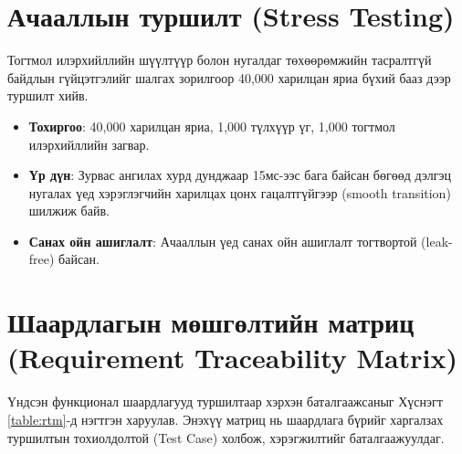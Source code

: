 \section{Ачааллын туршилт (Stress Testing)}
Тогтмол илэрхийллийн шүүлтүүр болон нугалдаг төхөөрөмжийн тасралтгүй байдлын гүйцэтгэлийг шалгах зорилгоор 40,000 харилцан яриа бүхий бааз дээр туршилт хийв.

\begin{itemize}
    \item \textbf{Тохиргоо}: 40,000 харилцан яриа, 1,000 түлхүүр үг, 1,000 тогтмол илэрхийллийн загвар.
    \item \textbf{Үр дүн}: Зурвас ангилах хурд дунджаар 15мс-ээс бага байсан бөгөөд дэлгэц нугалах үед хэрэглэгчийн харилцах цонх гацалтгүйгээр (smooth transition) шилжиж байв.
    \item \textbf{Санах ойн ашиглалт}: Ачааллын үед санах ойн ашиглалт тогтвортой (leak-free) байсан.
\end{itemize}

\section{Шаардлагын мөшгөлтийн матриц (Requirement Traceability Matrix)}
Үндсэн функционал шаардлагууд туршилтаар хэрхэн баталгаажсаныг Хүснэгт \ref{table:rtm}-д нэгтгэн харуулав. Энэхүү матриц нь шаардлага бүрийг харгалзах туршилтын тохиолдолтой (Test Case) холбож, хэрэгжилтийг баталгаажуулдаг.

\begin{table}[H]
    \centering
    \caption{Шаардлагын мөшгөлтийн матриц (RTM)}
    \label{table:rtm}
\end{table}
